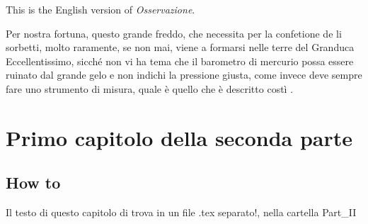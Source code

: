 %
\begin{observation}\normalfont
This is the English version of \emph{Osservazione}.
\end{observation}

Per nostra fortuna, questo grande freddo, che necessita per la confetione de li sorbetti, molto raramente, se non mai, viene a formarsi nelle terre del Granduca Eccellentissimo, sicch\'e non vi ha tema che il barometro di mercurio possa essere ruinato dal grande gelo e non indichi la pressione giusta, come invece deve sempre fare uno strumento di misura, quale \`e quello che \`e descritto cost\`i \cite{duane1964}.





\chapter{Primo capitolo della seconda parte}

\section{How to}
Il testo di questo capitolo di trova in un file .tex separato!, nella cartella Part\_II

\lipsum[1]